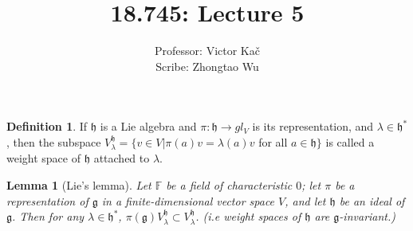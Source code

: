 \documentclass[10pt,twoside]{article}
\newcommand{\Ff}{\mathbb F}
\newcommand{\mg}{\mathfrak{g}}
\newcommand{\mh}{\mathfrak{h}}
\newtheorem{lemma}[theorem]{Lemma}
\theoremstyle{definition}
\newtheorem{definition}[theorem]{Definition}
\theoremstyle{remark}
\begin{document}
\title{18.745: Lecture 5}
\author{Professor: Victor Ka\v{c} \\ Scribe: Zhongtao Wu}
\date{}
\maketitle


\begin{definition}
If $\mh$ is a Lie algebra and $\pi: \mh \rightarrow gl_V$ is its representation, and $\lambda \in \mh^*$, then the subspace $V_{\lambda}^\mh=\{v\in V | \pi(a)v=\lambda(a)v$ for all $a\in \mh \}$ is called a weight space of $\mh$ attached to $\lambda$.  
\end{definition}

\begin{lemma}[Lie's lemma]
Let $\Ff$ be a field of characteristic $0$; let $\pi$ be a representation of $\mg$ in a finite-dimensional vector space $V$, and let $\mh$ be an ideal of $\mg$.  Then for any $\lambda\in \mh^*$, $\pi(\mg)V^{\mh}_{\lambda} \subset V^{\mh}_{\lambda}$. (i.e weight spaces of $\mh$ are $\mg$-invariant.)
\end{lemma}
\end{document}
